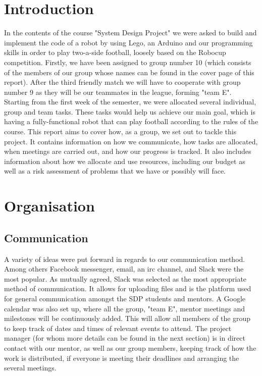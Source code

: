 \documentclass{article}
\begin{document}
\section{Introduction}
In the contents of the course "System Design Project" we were asked to build and implement the code of a robot by using Lego, an Arduino and our programming skills in order to play two-a-side football, loosely based on the Robocup competition. Firstly, we have been assigned to group number 10 (which consists of the members of our group whose names can be found in the cover page of this report). After the third friendly match we will have to cooperate with group number 9 as they will be our teammates in the league, forming "team E". Starting from the first week of the semester, we were allocated several individual, group and team tasks. These tasks would help us achieve our main goal, which is having a fully-functional robot that can play football according to the rules of the course. This report aims to cover how, as a group, we set out to tackle this project. It contains information on how we communicate, how tasks are allocated, when meetings are carried out, and how our progress is tracked. It also includes information about how we allocate and use resources, including our budget as well as a risk assessment of problems that we have or possibly will face.

\section{Organisation}
\subsection{Communication}
A variety of ideas were put forward in regards to our communication method. Among others Facebook messenger, email, an irc channel, and Slack were the most popular. As mutually agreed, Slack was selected as the most appropriate method of communication. It allows for uploading files and is the platform used for general communication amongst the SDP students and mentors. A Google calendar was also set up, where all the group, "team E", mentor meetings and milestones will be continuously added. This will allow all members of the group to keep track of dates and times of relevant events to attend. The project manager (for whom more details can be found in the next section) is in direct contact with our mentor, as well as our group members, keeping track of how the work is distributed, if everyone is meeting their deadlines and arranging the several meetings.
\end{document}
